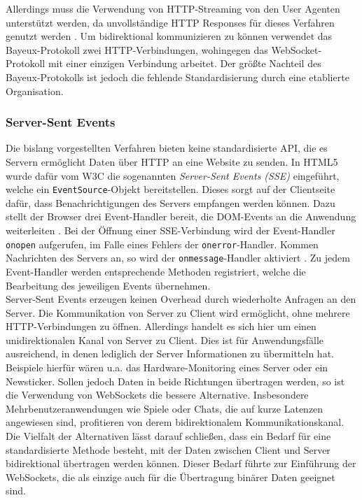 \documentclass[11pt,a4paper,titlepage]{scrartcl}
\numberwithin{equation}{section}
\begin{document}
\noindent Allerdings muss die Verwendung von HTTP-Streaming von den User Agenten unterstützt werden, da unvollständige HTTP Responses für dieses Verfahren genutzt werden \autocite{russell_cometd_2007}. Um bidirektional kommunizieren zu können verwendet das Bayeux-Protokoll zwei HTTP-Verbindungen, wohingegen das WebSocket-Protokoll mit einer einzigen Verbindung arbeitet. Der größte Nachteil des Bayeux-Protokolls ist jedoch die fehlende Standardisierung durch eine etablierte Organisation. 

\subsubsection{Server-Sent Events}\label{subsubsec:Server-SentEvents}
Die bislang vorgestellten Verfahren bieten keine standardisierte API, die es Servern ermöglicht Daten über HTTP an eine Website zu senden. In HTML5 wurde dafür vom W3C die sogenannten \textit{Server-Sent Events (SSE)} eingeführt, welche ein \texttt{EventSource}-Objekt bereitstellen. Dieses sorgt auf der Clientseite dafür, dass Benachrichtigungen des Servers empfangen werden können. Dazu stellt der Browser drei Event-Handler bereit, die DOM-Events an die Anwendung weiterleiten \autocite[31]{gorski_websockets_2015}. Bei der Öffnung einer SSE-Verbindung wird der Event-Handler \texttt{onopen} aufgerufen, im Falle eines Fehlers der \texttt{onerror}-Handler. Kommen Nachrichten des Servers an, so wird der \texttt{onmessage}-Handler aktiviert \autocite{hickson_server-sent_2009}. Zu jedem Event-Handler werden entsprechende Methoden registriert, welche die Bearbeitung des jeweiligen Events übernehmen.\\

\noindent Server-Sent Events erzeugen keinen Overhead durch wiederholte Anfragen an den Server. Die Kommunikation von Server zu Client wird ermöglicht, ohne mehrere HTTP-Verbindungen zu öffnen. Allerdings handelt es sich hier um einen unidirektionalen Kanal von Server zu Client. Dies ist für Anwendungsfälle ausreichend, in denen lediglich der Server Informationen zu übermitteln hat. Beispiele hierfür wären u.a. das Hardware-Monitoring eines Server oder ein Newsticker. Sollen jedoch Daten in beide Richtungen übertragen werden, so ist die Verwendung von WebSockets die bessere Alternative. Insbesondere Mehrbenutzeranwendungen wie Spiele oder Chats, die auf kurze Latenzen angewiesen sind, profitieren von derem bidirektionalem Kommunikationskanal. \\

\noindent Die Vielfalt der Alternativen lässt darauf schließen, dass ein Bedarf für eine standardisierte Methode besteht, mit der Daten zwischen Client und Server bidirektional übertragen werden können. Dieser Bedarf führte zur Einführung der WebSockets, die als einzige auch für die Übertragung binärer Daten geeignet sind.
\newpage
\end{document}

